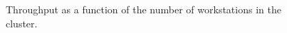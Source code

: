 \begin{figure}[t]
\vspace{-10pt}
\vspace{-20pt}
\caption{\small Throughput as a function of the number of workstations
in the cluster. 
\protect\label{fig:fhr-throughput}}
\vspace{-6pt}
\end{figure}

